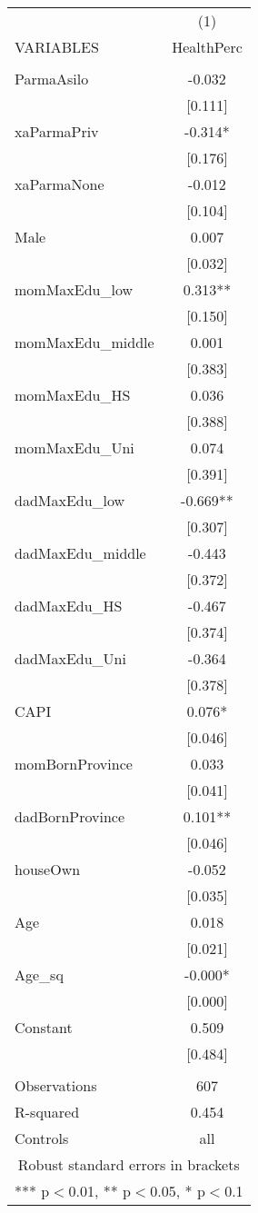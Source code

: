 \documentclass[]{article}
\begin{document}
\begin{tabular}{lc} \hline
 & (1) \\
VARIABLES & HealthPerc \\ \hline
 &  \\
ParmaAsilo & -0.032 \\
 & [0.111] \\
xaParmaPriv & -0.314* \\
 & [0.176] \\
xaParmaNone & -0.012 \\
 & [0.104] \\
Male & 0.007 \\
 & [0.032] \\
momMaxEdu\_low & 0.313** \\
 & [0.150] \\
momMaxEdu\_middle & 0.001 \\
 & [0.383] \\
momMaxEdu\_HS & 0.036 \\
 & [0.388] \\
momMaxEdu\_Uni & 0.074 \\
 & [0.391] \\
dadMaxEdu\_low & -0.669** \\
 & [0.307] \\
dadMaxEdu\_middle & -0.443 \\
 & [0.372] \\
dadMaxEdu\_HS & -0.467 \\
 & [0.374] \\
dadMaxEdu\_Uni & -0.364 \\
 & [0.378] \\
CAPI & 0.076* \\
 & [0.046] \\
momBornProvince & 0.033 \\
 & [0.041] \\
dadBornProvince & 0.101** \\
 & [0.046] \\
houseOwn & -0.052 \\
 & [0.035] \\
Age & 0.018 \\
 & [0.021] \\
Age\_sq & -0.000* \\
 & [0.000] \\
Constant & 0.509 \\
 & [0.484] \\
 &  \\
Observations & 607 \\
R-squared & 0.454 \\
 Controls & all \\ \hline
\multicolumn{2}{c}{ Robust standard errors in brackets} \\
\multicolumn{2}{c}{ *** p$<$0.01, ** p$<$0.05, * p$<$0.1} \\
\end{tabular}
\end{document}
